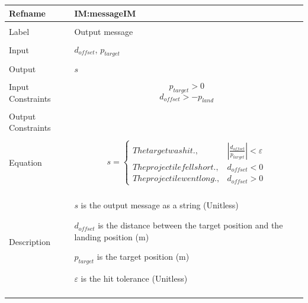 \documentclass[12pt]{article}
\begin{document}
\noindent \begin{minipage}{\textwidth}
\begin{tabular}{>{\raggedright}p{}>{\raggedright\arraybackslash}p{}}
\toprule \textbf{Refname} & \textbf{IM:messageIM}
\label{IM:messageIM}
\\ \midrule \\
Label & Output message
\\ \midrule \\
Input & ${d_{offset}}$, ${p_{target}}$
\\ \midrule \\
Output & $s$
\\ \midrule \\
Input Constraints & \begin{displaymath}
                    {p_{target}}>0
                    \end{displaymath}
                    \begin{displaymath}
                    {d_{offset}}>-{p_{land}}
                    \end{displaymath}
\\ \midrule \\
Output Constraints & 
\\ \midrule \\
Equation & \begin{displaymath}
           s=\begin{cases}
The target was hit., & |\frac{{d_{offset}}}{{p_{target}}}|<ε\\
The projectile fell short., & {d_{offset}}<0\\
The projectile went long., & {d_{offset}}>0
\end{cases}
           \end{displaymath}
\\ \midrule \\
Description & \begin{symbDescription}
              \item{$s$ is the output message as a string (Unitless)}
              \item{${d_{offset}}$ is the distance between the target position and the landing position (m)}
              \item{${p_{target}}$ is the target position (m)}
              \item{$ε$ is the hit tolerance (Unitless)}
              \end{symbDescription}
\\ \midrule \\

\end{tabular}
\end{minipage}
\end{document}
